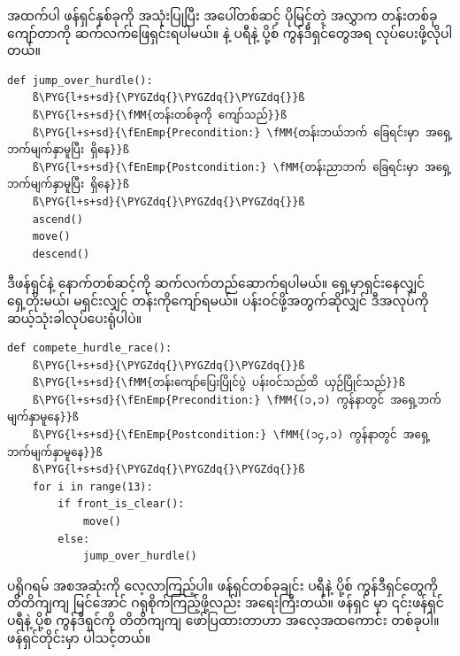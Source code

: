 အထက်ပါ ဖန်ရှင်နှစ်ခုကို အသုံးပြုပြီး အပေါ်တစ်ဆင့် ပိုမြင့်တဲ့ အလွှာက တန်းတစ်ခုကျော်တာကို ဆက်လက်ဖြေရှင်းရပါမယ်။  နဲ့  ပရီနဲ့ ပို့စ် ကွန်ဒီရှင်တွေအရ  လုပ်ပေးဖို့လိုပါတယ်။
%
\setlength{\fboxsep}{0pt}
\begin{verbatim}
def jump_over_hurdle():
    ß\PYG{l+s+sd}{\PYGZdq{}\PYGZdq{}\PYGZdq{}}ß
    ß\PYG{l+s+sd}{\fMM{တန်းတစ်ခုကို ကျော်သည်}}ß
    ß\PYG{l+s+sd}{\fEnEmp{Precondition:} \fMM{တန်းဘယ်ဘက် ခြေရင်းမှာ အရှေ့ဘက်မျက်နှာမူပြီး ရှိနေ}}ß
    ß\PYG{l+s+sd}{\fEnEmp{Postcondition:} \fMM{တန်းညာဘက် ခြေရင်းမှာ အရှေ့ဘက်မျက်နှာမူပြီး ရှိနေ}}ß
    ß\PYG{l+s+sd}{\PYGZdq{}\PYGZdq{}\PYGZdq{}}ß
    ascend()
    move()
    descend()
\end{verbatim}
%

ဒီဖန်ရှင်နဲ့ နောက်တစ်ဆင့်ကို ဆက်လက်တည်ဆောက်ရပါမယ်။ ရှေ့မှာရှင်းနေလျှင် ရှေ့တိုးမယ်၊ မရှင်းလျှင် တန်းကိုကျော်ရမယ်။ ပန်းဝင်ဖို့အတွက်ဆိုလျှင် ဒီအလုပ်ကို ဆယ့်သုံးခါလုပ်ပေးရုံပါပဲ။
%
\setlength{\fboxsep}{0pt}
\begin{verbatim}
def compete_hurdle_race():
    ß\PYG{l+s+sd}{\PYGZdq{}\PYGZdq{}\PYGZdq{}}ß
    ß\PYG{l+s+sd}{\fMM{တန်းကျော်ပြေးပြိုင်ပွဲ ပန်းဝင်သည်ထိ ယှဉ်ပြိုင်သည်}}ß
    ß\PYG{l+s+sd}{\fEnEmp{Precondition:} \fMM{(၁,၁) ကွန်နာတွင် အရှေ့ဘက်မျက်နှာမူနေ}}ß
    ß\PYG{l+s+sd}{\fEnEmp{Postcondition:} \fMM{(၁၄,၁) ကွန်နာတွင် အရှေ့ဘက်မျက်နှာမူနေ}}ß
    ß\PYG{l+s+sd}{\PYGZdq{}\PYGZdq{}\PYGZdq{}}ß
    for i in range(13):
        if front_is_clear():
            move()
        else:
            jump_over_hurdle()
\end{verbatim}
%

ပရိုဂရမ် အစအဆုံးကို လေ့လာကြည့်ပါ။ ဖန်ရှင်တစ်ခုချင်း ပရီနဲ့ ပို့စ် ကွန်ဒီရှင်တွေကို တိတိကျကျ မြင်အောင် ဂရုစိုက်ကြည့်ဖို့လည်း အရေးကြီးတယ်။ ဖန်ရှင်  မှာ ၎င်းဖန်ရှင် ပရီနဲ့ ပို့စ် ကွန်ဒီရှင်ကို တိတိကျကျ ဖော်ပြထားတာဟာ အလေ့အထကောင်း တစ်ခုပါ။ ဖန်ရှင်တိုင်းမှာ ပါသင့်တယ်။


